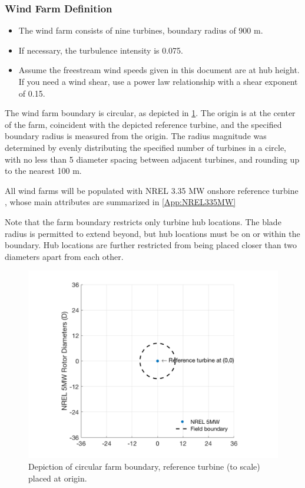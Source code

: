 \documentclass[12pt]{article}
\begin{document}
    \subsubsection{Wind Farm Definition}
    \begin{itemize}
        \item The wind farm consists of nine turbines, boundary radius of 900 m.
        \item If necessary, the turbulence intensity is 0.075.
        \item Assume the freestream wind speeds given in this document are at hub height. If you need a wind shear, use a power law relationship with a shear exponent of 0.15.
    \end{itemize}
    
    The wind farm boundary is circular, as depicted in \cref{fig:EmptyCmbndFarm}. The origin is at the center of the farm, coincident with the depicted reference turbine, and the specified boundary radius is measured from the origin. The radius magnitude was determined by evenly distributing the specified number of turbines in a circle, with no less than 5 diameter spacing between adjacent turbines, and rounding up to the nearest 100 m.
    
    All wind farms will be populated with NREL 3.35 MW onshore reference turbine \cite{NREL335MW}, whose main attributes are summarized in \cref{App:NREL335MW}
    
    Note that the farm boundary restricts only turbine hub locations. The blade radius is permitted to extend beyond, but hub locations must be on or within the boundary. Hub locations are further restricted from being placed closer than two diameters apart from each other.
    
    \begin{figure}[H]
        \centering
        \includegraphics[width=.65\linewidth]{EmptyCmbndFarm.png}
        \caption{Depiction of circular farm boundary, reference turbine (to scale) placed at origin.}
        \label{fig:EmptyCmbndFarm}
    \end{figure}
\end{document}
